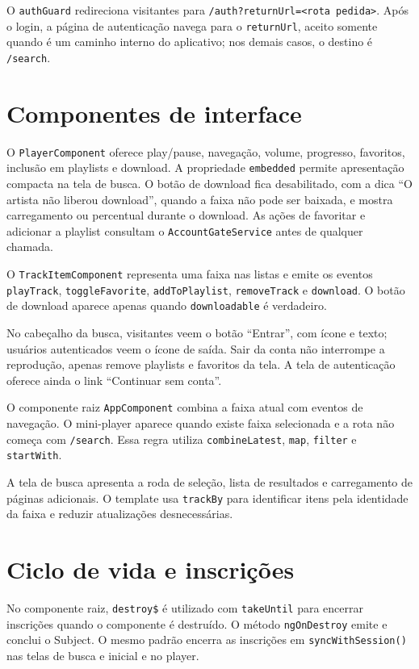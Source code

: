 \documentclass[12pt,a4paper,oneside]{report}
\begin{document}
O \texttt{authGuard} redireciona visitantes para \texttt{/auth?returnUrl=<rota pedida>}. Após o login, a página de autenticação navega para o \texttt{returnUrl}, aceito somente quando é um caminho interno do aplicativo; nos demais casos, o destino é \texttt{/search}.

\section{Componentes de interface}
O \texttt{PlayerComponent} oferece play/pause, navegação, volume, progresso, favoritos, inclusão em playlists e download. A propriedade \texttt{embedded} permite apresentação compacta na tela de busca. O botão de download fica desabilitado, com a dica ``O artista não liberou download'', quando a faixa não pode ser baixada, e mostra carregamento ou percentual durante o download. As ações de favoritar e adicionar a playlist consultam o \texttt{AccountGateService} antes de qualquer chamada.

O \texttt{TrackItemComponent} representa uma faixa nas listas e emite os eventos \texttt{playTrack}, \texttt{toggleFavorite}, \texttt{addToPlaylist}, \texttt{removeTrack} e \texttt{download}. O botão de download aparece apenas quando \texttt{downloadable} é verdadeiro.

No cabeçalho da busca, visitantes veem o botão ``Entrar'', com ícone e texto; usuários autenticados veem o ícone de saída. Sair da conta não interrompe a reprodução, apenas remove playlists e favoritos da tela. A tela de autenticação oferece ainda o link ``Continuar sem conta''.

O componente raiz \texttt{AppComponent} combina a faixa atual com eventos de navegação. O mini-player aparece quando existe faixa selecionada e a rota não começa com \texttt{/search}. Essa regra utiliza \texttt{combineLatest}, \texttt{map}, \texttt{filter} e \texttt{startWith}.

A tela de busca apresenta a roda de seleção, lista de resultados e carregamento de páginas adicionais. O template usa \texttt{trackBy} para identificar itens pela identidade da faixa e reduzir atualizações desnecessárias.

\section{Ciclo de vida e inscrições}
No componente raiz, \texttt{destroy\$} é utilizado com \texttt{takeUntil} para encerrar inscrições quando o componente é destruído. O método \texttt{ngOnDestroy} emite e conclui o Subject. O mesmo padrão encerra as inscrições em \texttt{syncWithSession()} nas telas de busca e inicial e no player.
\end{document}
